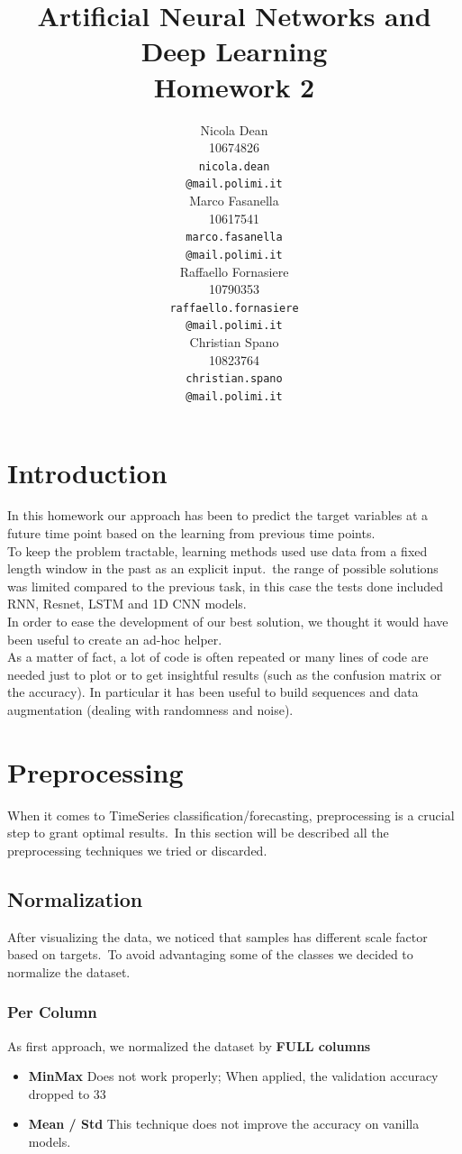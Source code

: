 \documentclass[11pt]{article}
\title{Artificial Neural Networks and Deep Learning \\
Homework 2}
\author{
  Nicola Dean \\
  10674826 \\
  {\tt nicola.dean \\
  \tt @mail.polimi.it} \\\And
  Marco Fasanella \\
  10617541 \\
  {\tt marco.fasanella \\
  \tt @mail.polimi.it} \\\And
  Raffaello Fornasiere \\
    10790353 \\
    {\tt raffaello.fornasiere \\
    \tt @mail.polimi.it} \\\And
  Christian Spano \\
  10823764 \\
  {\tt christian.spano \\
  \tt @mail.polimi.it} \\}
\date{}
\begin{document}
\maketitle


\section{Introduction}
In this homework our approach has been to predict the target variables at a future time point based on the learning from previous time points.\\
To keep the problem tractable, learning methods used  use data from a fixed length window in the past as an explicit input.\
the range of possible solutions was limited compared to the previous task, in this case the tests done included RNN, Resnet, LSTM and 1D CNN models.\\
In order to ease the development of our best solution, we thought it would have been useful to create an ad-hoc helper.\\
As a matter of fact, a lot of code is often repeated or many lines of code are needed just to plot or to get insightful results (such as the confusion matrix or the accuracy).
In particular it has been useful to build sequences and data augmentation (dealing with randomness and noise).

\section{Preprocessing}
When it comes to TimeSeries classification/forecasting, preprocessing is a crucial step to grant optimal results.\
In this section will be described all the preprocessing techniques we tried or discarded.
\subsection{Normalization}
After visualizing the data, we noticed that samples has different scale factor based on targets.\
To avoid advantaging some of the classes we decided to normalize the dataset.
\subsubsection{Per Column}
As first approach, we normalized the dataset by \textbf{FULL columns}
\begin{itemize}
  \item \textbf{MinMax} Does not work properly; When applied, the validation accuracy dropped to 33%
  \item \textbf{Mean / Std} This technique does not improve the accuracy on vanilla models.
\end{itemize}
\end{document}
